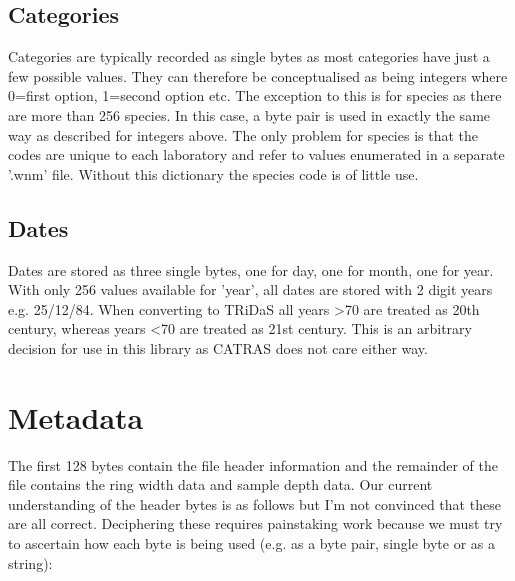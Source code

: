 \documentclass[10pt, headsepline,DIV14,BCOR0.5cm]{scrreprt}
\begin{document}
\subsection{Categories}

Categories are typically recorded as single bytes as most categories have just a few possible values. They can therefore be conceptualised as being integers where 0=first option, 1=second option etc. The exception to this is for species as there are more than 256 species. In this case, a byte pair is used in exactly the same way as described for integers above. The only problem for species is that the codes are unique to each laboratory and refer to values enumerated in a separate '.wnm' file. Without this dictionary the species code is of little use. 

\subsection{Dates}

Dates are stored as three single bytes, one for day, one for month, one for year. With only 256 values available for 'year', all dates are stored with 2 digit years e.g. 25/12/84. When converting to TRiDaS all years >70 are treated as 20th century, whereas years <70 are treated as 21st century. This is an arbitrary decision for use in this library as CATRAS does not care either way. 

\section{Metadata}

The first 128 bytes contain the file header information and the remainder of the file contains the ring width data and sample depth data. Our current understanding of the header bytes is as follows but I'm not convinced that these are all correct. Deciphering these requires painstaking work because we must try to ascertain how each byte is being used (e.g. as a byte pair, single byte or as a string): 
\end{document}
